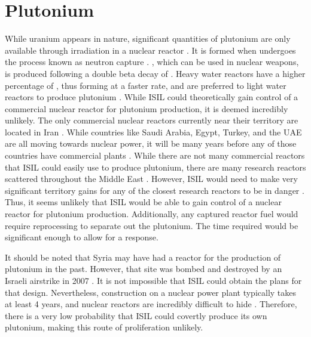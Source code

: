 \documentclass{report}
\begin{document}
\section{Plutonium} 

While uranium appears in nature, significant quantities of plutonium are only available through irradiation in a nuclear reactor \cite{Benedict1981}. It is formed when  undergoes the process known as neutron capture \cite{Benedict1981}. , which can be used in nuclear weapons, is produced following a double beta decay of  \cite{Duderstadt1976}. Heavy water reactors have a higher percentage of , thus forming  at a faster rate, and are preferred to light water reactors to produce plutonium \cite{Moody2014}. While ISIL could theoretically gain control of a commercial nuclear reactor for plutonium production, it is deemed incredibly unlikely. The only commercial nuclear reactors currently near their territory are located in Iran \cite{WorldNuclearAssociation2015}. While countries like Saudi Arabia, Egypt, Turkey, and the UAE are all moving towards nuclear power, it will be many years before any of those countries have commercial plants \cite{WorldNuclearAssociation2015}. While there are not many commercial reactors that ISIL could easily use to produce plutonium, there are many research reactors scattered throughout the Middle East \cite{WorldNuclearAssociation2015a}. However, ISIL would need to make very significant territory gains for any of the closest research reactors to be in danger \cite{BBC2015}. Thus, it seems unlikely that ISIL would be able to gain control of a nuclear reactor for plutonium production. Additionally, any captured reactor fuel would require reprocessing to separate out the plutonium. The time required would be significant enough to allow for a response.  

It should be noted that Syria may have had a reactor for the production of plutonium in the past. However, that site was bombed and destroyed by an Israeli airstrike in 2007 \cite{WorldNuclearAssociation2015a}. It is not impossible that ISIL could obtain the plans for that design. Nevertheless, construction on a nuclear power plant typically takes at least 4 years, and nuclear reactors are incredibly difficult to hide \cite{WorldNuclearAssociation2015a,NuclearEnergyInstitute2015}. Therefore, there is a very low probability that ISIL could covertly produce its own plutonium, making this route of proliferation unlikely.  
\end{document}
